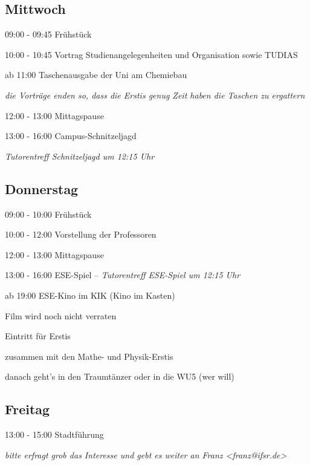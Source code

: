 \documentclass[a4paper,12pt]{report}
\begin{document}
\subsection{Mittwoch}
\begin{itemize*}
\item 09:00 - 09:45 Frühstück
\item 10:00 - 10:45 Vortrag Studienangelegenheiten und Organisation sowie TUDIAS
\item ab 11:00 Taschenausgabe der Uni am Chemiebau
\begin{itemize*}
  \item \small{\textit{die Vorträge enden so, dass die Erstis genug Zeit haben die Taschen zu ergattern}}
\end{itemize*}
\item 12:00 - 13:00 Mittagspause
\item 13:00 - 16:00 Campus-Schnitzeljagd
\begin{itemize*}
  \item \small{\textit{Tutorentreff Schnitzeljagd um 12:15 Uhr}}
\end{itemize*}
\end{itemize*}

\subsection{Donnerstag}
\begin{itemize*}
\item 09:00 - 10:00 Frühstück
\item 10:00 - 12:00 Vorstellung der Professoren
\item 12:00 - 13:00 Mittagspause
\item 13:00 - 16:00 ESE-Spiel -- \small{\textit{Tutorentreff ESE-Spiel um 12:15 Uhr}}
\item ab 19:00 ESE-Kino im KIK (Kino im Kasten)
\begin{itemize*}
	\item Film wird noch nicht verraten
	\item Eintritt für Erstis 
	\item zusammen mit den Mathe- und Physik-Erstis
	\item danach geht's in den Traumtänzer oder in die WU5 (wer will)
\end{itemize*}
\end{itemize*}

\subsection{Freitag}
\begin{itemize*}
\item 13:00 - 15:00 Stadtführung
\begin{itemize*}
  \item \small{\textit{bitte erfragt grob das Interesse und gebt es weiter an Franz <franz@ifsr.de>}}
\end{itemize*}
\end{itemize*}
\end{document}
